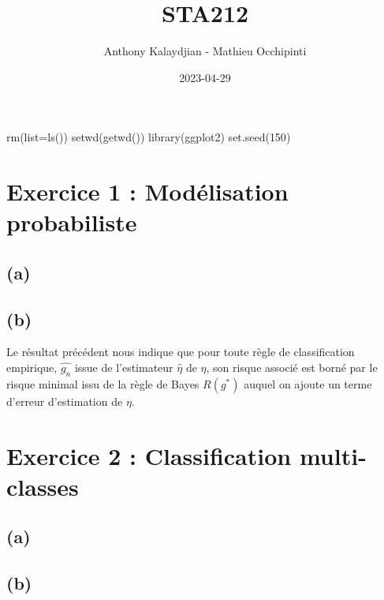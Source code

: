 \documentclass[
]{article}
\title{STA212}
\author{Anthony Kalaydjian - Mathieu Occhipinti}
\date{2023-04-29}
\newenvironment{Shaded}{\begin{snugshade}}{\end{snugshade}}
\newcommand{\AttributeTok}[1]{\textcolor[rgb]{0.77,0.63,0.00}{#1}}
\newcommand{\DecValTok}[1]{\textcolor[rgb]{0.00,0.00,0.81}{#1}}
\newcommand{\FunctionTok}[1]{\textcolor[rgb]{0.00,0.00,0.00}{#1}}
\newcommand{\NormalTok}[1]{#1}
\begin{document}
\maketitle

\begin{Shaded}
\begin{Highlighting}[]
\FunctionTok{rm}\NormalTok{(}\AttributeTok{list=}\FunctionTok{ls}\NormalTok{())}
\FunctionTok{setwd}\NormalTok{(}\FunctionTok{getwd}\NormalTok{())}
\FunctionTok{library}\NormalTok{(ggplot2)}
\FunctionTok{set.seed}\NormalTok{(}\DecValTok{150}\NormalTok{)}
\end{Highlighting}
\end{Shaded}

\hypertarget{exercice-1-moduxe9lisation-probabiliste}{%
\section{Exercice 1 : Modélisation
probabiliste}\label{exercice-1-moduxe9lisation-probabiliste}}

\hypertarget{a}{%
\subsection{(a)}\label{a}}

\hypertarget{b}{%
\subsection{(b)}\label{b}}

Le résultat précédent nous indique que pour toute règle de
classification empirique, \(\hat{g_n}\) issue de l'estimateur
\(\hat{\eta}\) de \(\eta\), son risque associé est borné par le risque
minimal issu de la règle de Bayes \(R(g^*)\) auquel on ajoute un terme
d'erreur d'estimation de \(\eta\).

\hypertarget{exercice-2-classification-multi-classes}{%
\section{Exercice 2 : Classification
multi-classes}\label{exercice-2-classification-multi-classes}}

\hypertarget{a-1}{%
\subsection{(a)}\label{a-1}}

\hypertarget{b-1}{%
\subsection{(b)}\label{b-1}}
\end{document}
